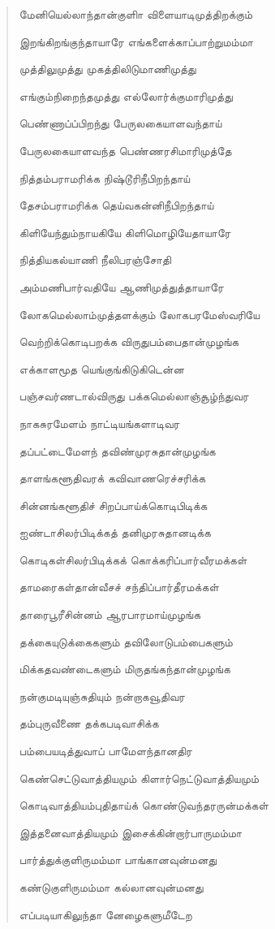 \documentclass{article}
\begin{document}
\begin{quotation}
{மேனியெல்லாந்தான்குளிா விளையாடிமுத்திறக்கும்

இறங்கிறங்குந்தாயாரே எங்களைக்காப்பாற்றுமம்மா

முத்திலுமுத்து முகத்திலிடுமாணிமுத்து

எங்கும்நிறைந்தமுத்து எல்லாேர்க்குமாரிமுத்து

பெண்ணாப்ப்பிறந்து பேருலகையாளவந்தாய்

பேருலகையாளவந்த பெண்ணரசிமாரிமுத்தே

நித்தம்பராமரிக்க நிஷ்டூரிநீபிறந்தாய்

தேசம்பராமரிக்க தெய்வகன்னிநீபிறந்தாய்

கிளியேந்தும்நாயகியே கிளிமொழியேதாயாரே

நித்தியகல்யாணி நீலிபரஞ்சோதி

அம்மணிபார்வதியே ஆணிமுத்துத்தாயாரே

லோகமெல்லாம்முத்தளக்கும் லோகபரமேஸ்வரியே

வெற்றிக்கொடிபறக்க விருதுபம்பைதான்முழங்க

எக்காளமூத யெங்குங்கிடுகிடென்ன

பஞ்சவர்ணடால்விருது பக்கமெல்லாஞ்சூழ்ந்துவர

நாகசுரமேளம் நாட்டியங்களாடிவர

தப்பட்டைமேளந் தவிண்முரசுதான்முழங்க

தாளங்களூதிவரக் கவிவாணரெச்சரிக்க

சின்னங்களூதிச் சிறப்பாய்க்கொடிபிடிக்க

ஐண்டாசிலர்பிடிக்கத் தனிமுரசுதானடிக்க

கொடிகள்சிலர்பிடிக்கக் கொக்கரிப்பார்வீரமக்கள்

தாமரைகள்தான்வீசச் சந்திப்பார்தீரமக்கள்

தாரைபூரீசின்னம் ஆரபாரமாய்முழங்க

தக்கையுடுக்கைகளும் தவிலோடுபம்பைகளும்

மிக்கதவண்டைகளும் மிருதங்கந்தான்முழங்க

நன்குமடியுஞ்சுதியும் நன்றாகவூதிவர

தம்புருவீணை தக்கபடிவாசிக்க

பம்பையடித்துவாப் பாமேளந்தானதிர

கெண்செட்டுவாத்தியமும் கிளார்நெட்டுவாத்தியமும்

கொடிவாத்தியம்புதிதாய்க் கொண்டுவந்தரருன்மக்கள்

இத்தனைவாத்தியமும் இசைக்கின்றார்பாருமம்மா

பார்த்துக்குளிருமம்மா பாங்கானவுன்மனது

கண்டுகுளிருமம்மா கல்லானவுன்மனது

எப்படியாகிலுந்தா னேழைகளுமீடேற

}
\end{quotation}
\end{document}
